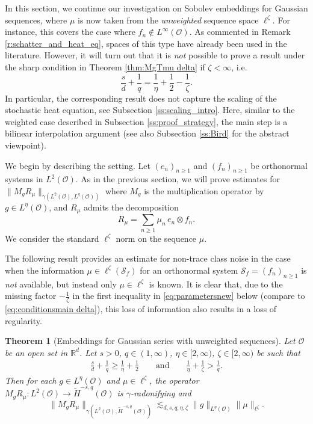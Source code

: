 \documentclass[reqno]{amsart}
\theoremstyle{plain}
\newtheorem{theorem}{Theorem}[section]
\theoremstyle{remark}
\theoremstyle{plain}
\numberwithin{equation}{section}
\newcommand\cO{\mathcal{O}}
\def\R{{\mathbb R}}
\newcommand{\g}{\gamma}
\newcommand{\Domm}{\mathcal{O}}
\newcommand{\wt}{\widetilde}
\newcommand{\1}{\one}
\newcommand{\Sf}{\mathcal{S}_{f}}
\begin{document}
In this section, we continue our investigation on Sobolev embeddings for Gaussian sequences, where $\mu$ is now taken from the \emph{unweighted} sequence space $\ell^\zeta$. For instance, this covers the case where $f_n\not\in L^\infty(\cO)$.
As commented in Remark \ref{r:schatter_and_heat_eq}, spaces of this type have already been used in the literature. However, it will turn out that it is \emph{not}  possible to prove a result under the sharp condition in Theorem \ref{thm:MgTmu delta} if $\zeta<\infty$, i.e.
\begin{equation}
\label{eq:schatten_section_sharp_condition}
\frac{s}{d} + \frac{1}{q}  = \frac{1}{\eta} + \frac{1}{2} - \frac{1}{\zeta}.
\end{equation}
In particular, the corresponding result does not capture the scaling of the stochastic heat equation, see Subsection \ref{ss:scaling_intro}.
Here, similar to the weighted case described in Subsection \ref{ss:proof_strategy}, the main step is a bilinear interpolation argument (see also Subsection \ref{ss:Bird} for the abstract viewpoint).

\smallskip

We begin by describing the setting. 
Let $(e_n)_{n\geq 1}$ and $(f_n)_{n\geq 1}$ be orthonormal systems in $L^2(\cO)$. As in the previous section, we will prove estimates for
$\|M_g R_{\mu}\|_{\g(L^2(\Domm),L^q(\Domm))}$ where $M_g$ is the multiplication operator by $g\in L^\eta(\Domm)$, and $R_{\mu}$ admits the decomposition 
\begin{equation}
\label{eq:T_decomposition_schatten_section}
R_{\mu}=\sum_{n\geq 1} \mu_n\, e_n\otimes f_n.
\end{equation}
We consider the standard $\ell^\zeta$ norm on the sequence $\mu$. 

\smallskip

The following result provides an estimate for non-trace class noise in the case when the information $\mu\in \ell^\zeta(\Sf)$ for an orthonormal system $\Sf  = (f_n)_{n\geq 1}$ is \textit{not} available, but instead only $\mu\in\ell^\zeta$ is known. It is clear that, due to the missing factor $-\tfrac{1}{\zeta}$ in the first inequality in \eqref{eq:parametersnew} below (compare to \eqref{eq:conditionsmain delta}), this loss of information also  results in a loss of regularity.

\begin{theorem}[Embeddings for Gaussian series with unweighted sequences]
\label{thm:generalONB}
Let $\Domm$ be an open set in $\R^d$.
Let $s>0$, $q\in (1, \infty)$, $\eta\in [2, \infty)$, $\zeta\in [2, \infty)$ be such that
\begin{align}
\label{eq:parametersnew}
\frac{s}{d} + \frac{1}{q} \geq \frac{1}{\eta} +\frac12\qquad \text{and}  \qquad  \frac{1}{\eta} +\frac{1}{\zeta}>\frac{1}{q}.
\end{align}
Then for each $g\in L^{\eta}(\mathcal{O})$ and $\mu \in \ell^\zeta$, the operator $M_g R_{\mu}:L^2(\mathcal{O})\to \wt{H}^{-s,q}(\mathcal{O})$ is $\gamma$-radonifying and 
\[\|M_g R_{\mu}\|_{\gamma(L^2(\mathcal{O}),\wt{H}^{-s,q}(\mathcal{O}))}
\lesssim_{d,s,q,\eta,\zeta}
         \|g\|_{L^\eta(\cO)} \|\mu\|_{\ell^\zeta}  .
\]
\end{theorem}
\end{document}
